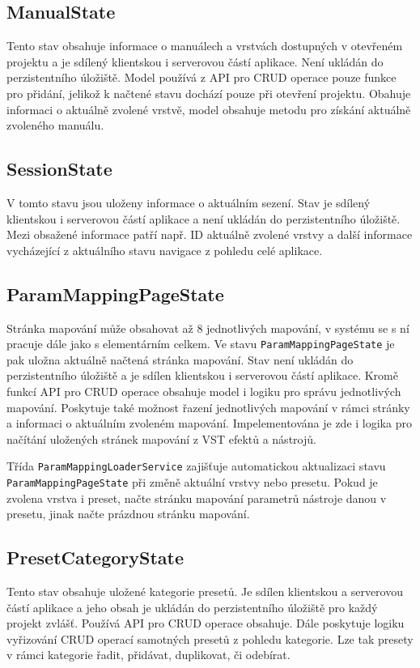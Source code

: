 \documentclass[thesis=M,czech]{FITthesis}[2019/03/06]
\begin{document}
		\subsection{ManualState}
			Tento stav obsahuje informace o manuálech a vrstvách dostupných v otevřeném projektu a je sdílený klientskou i serverovou částí aplikace. Není ukládán do perzistentního úložiště.
			Model používá z API pro CRUD operace pouze funkce pro přidání, jelikož k načtené stavu
			dochází pouze při otevření projektu. Obahuje informaci o aktuálně zvolené vrstvě, model obsahuje metodu
			pro získání aktuálně zvoleného manuálu.
		
		\subsection{SessionState}
			V tomto stavu jsou uloženy informace o aktuálním sezení. Stav je sdílený klientskou i serverovou částí aplikace a není ukládán do perzistentního úložiště.
			Mezi obsažené informace patří např. ID aktuálně zvolené vrstvy a další informace vycházející z aktuálního stavu navigace z pohledu celé aplikace.
			
		\subsection{ParamMappingPageState}
			Stránka mapování může obsahovat až 8 jednotlivých mapování, v systému se s ní pracuje dále jako s elementárním celkem. 
			Ve stavu \texttt{ParamMappingPageState} je pak uložna aktuálně načtená stránka mapování. Stav není ukládán do perzistentního úložiště a je sdílen klientskou i serverovou částí aplikace. 
			Kromě funkcí API pro CRUD operace obsahuje model i logiku pro správu jednotlivých mapování. 
			Poskytuje také možnost řazení jednotlivých mapování v rámci stránky a informaci
			o aktuálním zvoleném mapování. Impelementována je zde i logika pro načítání uložených stránek mapování
			z VST efektů a nástrojů.

			Třída \texttt{Param\-Mapping\-Loader\-Service} zajišťuje automatickou aktualizaci stavu \texttt{Param\-Mapping\-Page\-State} při změně aktuální vrstvy nebo presetu. Pokud je zvolena vrstva i preset, načte stránku mapování parametrů nástroje danou v presetu, jinak načte prázdnou stránku mapování.			
			
		\subsection{PresetCategoryState}
			Tento stav obsahuje uložené kategorie presetů. Je sdílen klientskou a serverovou částí aplikace
			a jeho obsah je ukládán do perzistentního úložiště pro každý projekt zvlášť.
			Používá API pro CRUD operace obsahuje. Dále poskytuje logiku vyřizování CRUD operací samotných presetů
			z pohledu kategorie. Lze tak presety v rámci kategorie řadit, přidávat, duplikovat, či odebírat.
			
\end{document}
